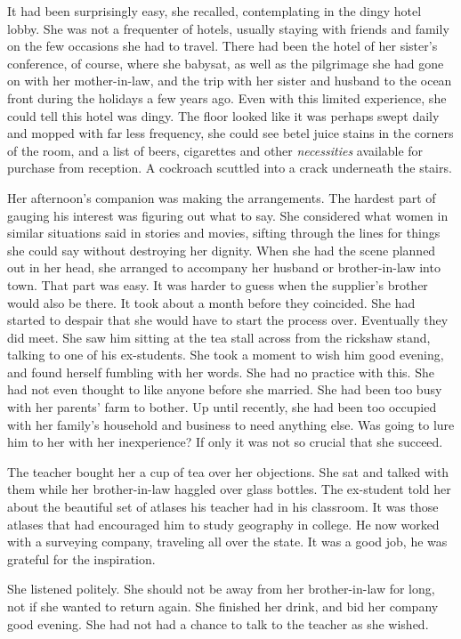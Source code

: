 \documentclass{article}
\begin{document}
It had been surprisingly easy, she recalled, contemplating in the dingy hotel lobby. She was not a frequenter of hotels, usually staying with friends and family on the few occasions she had to travel. There had been the hotel of her sister's conference, of course, where she babysat, as well as the pilgrimage she had gone on with her mother-in-law, and the trip with her sister and husband to the ocean front during the holidays a few years ago. Even with this limited experience, she could tell this hotel was dingy. The floor looked like it was perhaps swept daily and mopped with far less frequency, she could see betel juice stains in the corners of the room, and a list of beers, cigarettes and other \emph{necessities} available for purchase from reception. A cockroach scuttled into a crack underneath the stairs. 

Her afternoon's companion was making the arrangements. The hardest part of gauging his interest was figuring out what to say. She considered what women in similar situations said in stories and movies, sifting through the lines for things she could say without destroying her dignity. When she had the scene planned out in her head, she arranged to accompany her husband or brother-in-law into town. That part was easy. It was harder to guess when the supplier's brother would also be there. It took about a month before they coincided. She had started to despair that she would have to start the process over. Eventually they did meet. She saw him sitting at the tea stall across from the rickshaw stand, talking to one of his ex-students. She took a moment to wish him good evening, and found herself fumbling with her words. She had no practice with this. She had not even thought to like anyone before she married. She had been too busy with her parents' farm to bother. Up until recently, she had been too occupied with her family's household and business to need anything else. Was going to lure him to her with her inexperience? If only it was not so crucial that she succeed. 

The teacher bought her a cup of tea over her objections. She sat and talked with them while her brother-in-law haggled over glass bottles. The ex-student told her about the beautiful set of atlases his teacher had in his classroom. It was those atlases that had encouraged him to study geography in college. He now worked with a surveying company, traveling all over the state. It was a good job, he was grateful for the inspiration. 

She listened politely. She should not be away from her brother-in-law for long, not if she wanted to return again. She finished her drink, and bid her company good evening. She had not had a chance to talk to the teacher as she wished.
\end{document}
